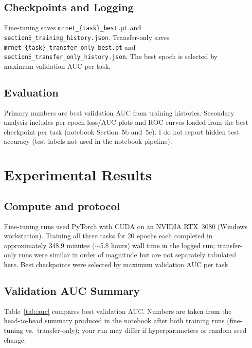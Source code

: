 \documentclass[10pt,twocolumn]{article}
\begin{document}
\subsection{Checkpoints and Logging}

Fine-tuning saves \texttt{mrnet\_\{task\}\_best.pt} and \texttt{section5\_training\_history.json}. Transfer-only saves \texttt{mrnet\_\{task\}\_transfer\_only\_best.pt} and \texttt{section5\_transfer\_only\_history.json}. The best epoch is selected by maximum validation AUC per task.

\subsection{Evaluation}

Primary numbers are best validation AUC from training histories. Secondary analysis includes per-epoch loss/AUC plots and ROC curves loaded from the best checkpoint per task (notebook Section~5b and~5e). I do not report hidden test accuracy (test labels not used in the notebook pipeline).

\section{Experimental Results}
\label{sec:results}

\subsection{Compute and protocol}

Fine-tuning runs used PyTorch with CUDA on an NVIDIA RTX~3080 (Windows workstation). Training all three tasks for $20$ epochs each completed in approximately 348.9 minutes ($\sim$5.8 hours) wall time in the logged run; transfer-only runs were similar in order of magnitude but are not separately tabulated here. Best checkpoints were selected by maximum validation AUC per task.

\subsection{Validation AUC Summary}

Table~\ref{tab:auc} compares best validation AUC. Numbers are taken from the head-to-head summary produced in the notebook after both training runs (fine-tuning vs.\ transfer-only); your run may differ if hyperparameters or random seed change.
\end{document}
